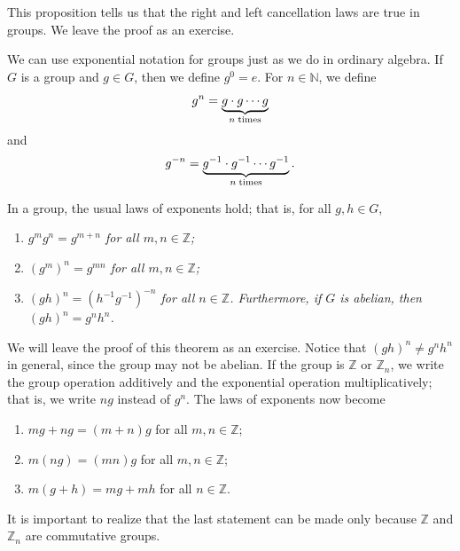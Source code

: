 This proposition tells us that the {\bfi right and 
left cancellation laws\/} are true in groups.  We leave the proof as an exercise.
 
 
We can use exponential notation for groups just as we do in ordinary
algebra. If $G$ is a group and $g \in G$, then we define $g^0 = e$.
For $n \in {\mathbb N}$, we define 
\[
g^n = \underbrace{g \cdot g \cdots g}_{n \; {\rm times}}
\]
and
\[
g^{-n} = \underbrace{g^{-1} \cdot g^{-1} \cdots g^{-1}}_{n
\; {\rm times}}.
\]
 
 
\begin{theorem}\label{exponent_laws}
In a group, the usual laws of exponents hold; that is, for all $g, h
\in G$,
\begin{enumerate}
 
\rm \item \it
$g^mg^n = g^{m+n}$ for all $m, n \in {\mathbb Z}$; 
 
\rm \item \it
$(g^m)^n = g^{mn}$ for all $m, n \in {\mathbb Z}$; 
 
\rm \item \it
$(gh)^n = (h^{-1}g^{-1})^{-n}$ for all $n \in {\mathbb Z}$. Furthermore,
if $G$ is abelian, then $(gh)^n = g^nh^n$. 
 
\end{enumerate}
\end{theorem}
 
 
We will leave the proof of this theorem as an exercise. Notice that
$(gh)^n \neq g^nh^n$ in general, since the group may not be abelian.
If the group is ${\mathbb Z}$ or ${\mathbb Z}_n$, we write the group
operation additively and the exponential operation multiplicatively;
that is, we write $ng$ instead of $g^n$. The laws of exponents now
become 
\begin{enumerate}
 
\item
$mg + ng = (m+n)g$ for all $m, n \in {\mathbb Z}$;
 
\item
$m(ng) = (mn)g$ for all $m, n \in {\mathbb Z}$;
 
\item
$m(g + h) = mg + mh$ for all $n \in {\mathbb Z}$.
 
\end{enumerate}
It is important to realize that the last statement can be made only
because ${\mathbb Z}$ and  ${\mathbb Z}_n$ are commutative groups.
 
 
 

